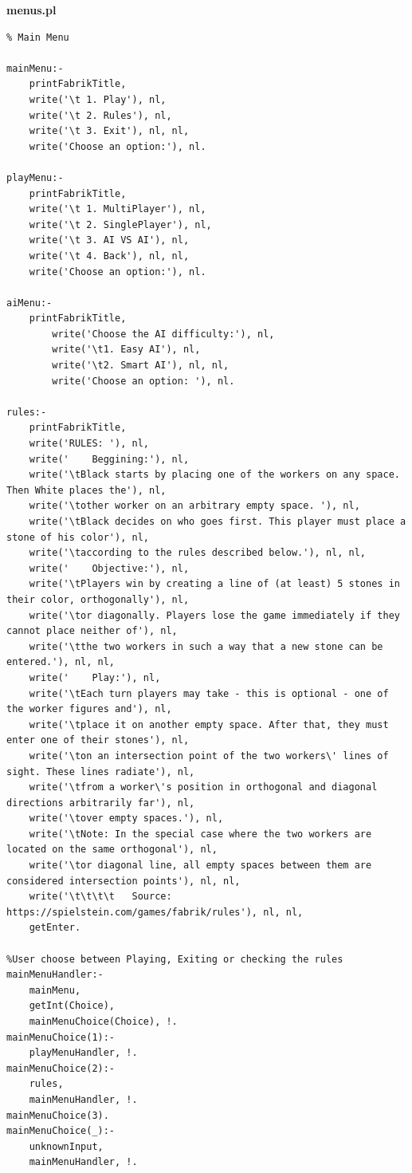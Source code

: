 \documentclass[a4paper]{article}
\begin{document}
\huge\textbf{menus.pl}
\begin{lstlisting}
% Main Menu

mainMenu:-
	printFabrikTitle,
	write('\t 1. Play'), nl,
	write('\t 2. Rules'), nl,
	write('\t 3. Exit'), nl, nl,
	write('Choose an option:'), nl.

playMenu:-
	printFabrikTitle,
	write('\t 1. MultiPlayer'), nl,
	write('\t 2. SinglePlayer'), nl,
	write('\t 3. AI VS AI'), nl,
	write('\t 4. Back'), nl, nl,
	write('Choose an option:'), nl.

aiMenu:-
	printFabrikTitle,
        write('Choose the AI difficulty:'), nl,
        write('\t1. Easy AI'), nl,
        write('\t2. Smart AI'), nl, nl,
        write('Choose an option: '), nl.

rules:-
	printFabrikTitle,
	write('RULES: '), nl,
	write('    Beggining:'), nl,
	write('\tBlack starts by placing one of the workers on any space. Then White places the'), nl, 
	write('\tother worker on an arbitrary empty space. '), nl,
	write('\tBlack decides on who goes first. This player must place a stone of his color'), nl, 
	write('\taccording to the rules described below.'), nl, nl,
	write('    Objective:'), nl,
	write('\tPlayers win by creating a line of (at least) 5 stones in their color, orthogonally'), nl,
	write('\tor diagonally. Players lose the game immediately if they cannot place neither of'), nl,
	write('\tthe two workers in such a way that a new stone can be entered.'), nl, nl,
	write('    Play:'), nl,
	write('\tEach turn players may take - this is optional - one of the worker figures and'), nl,
	write('\tplace it on another empty space. After that, they must enter one of their stones'), nl,
	write('\ton an intersection point of the two workers\' lines of sight. These lines radiate'), nl,
	write('\tfrom a worker\'s position in orthogonal and diagonal directions arbitrarily far'), nl,
	write('\tover empty spaces.'), nl,
	write('\tNote: In the special case where the two workers are located on the same orthogonal'), nl,
	write('\tor diagonal line, all empty spaces between them are considered intersection points'), nl, nl,
	write('\t\t\t\t   Source: https://spielstein.com/games/fabrik/rules'), nl, nl,
	getEnter.

%User choose between Playing, Exiting or checking the rules
mainMenuHandler:-
	mainMenu,
	getInt(Choice),
	mainMenuChoice(Choice), !.
mainMenuChoice(1):-
	playMenuHandler, !.
mainMenuChoice(2):-
	rules,
	mainMenuHandler, !.
mainMenuChoice(3).
mainMenuChoice(_):-
	unknownInput,
	mainMenuHandler, !.


\end{lstlisting}
\end{document}
